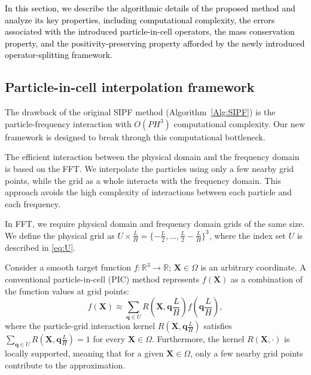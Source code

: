 \documentclass[review,onefignum,onetabnum]{siamart250211}
\begin{document}
\textcolor{black}{
In this section, we describe the algorithmic details of the proposed method and analyze its key properties, including computational complexity, the errors associated with the introduced particle-in-cell operators, the mass conservation property, and the positivity-preserving property afforded by the newly introduced operator-splitting framework.}
\label{sec:PIC}
\subsection{Particle-in-cell interpolation framework}\label{subsec:interpolation}
The drawback of the original SIPF method (Algorithm~\ref{Alg:SIPF}) is the particle-frequency interaction with $O(PH^3)$ computational complexity. Our new framework is designed to break through this computational bottleneck.

The efficient interaction between the physical domain and the frequency domain is based on the FFT. We interpolate the particles using only a few nearby grid points, while the grid as a whole interacts with the frequency domain. This approach avoids the high complexity of interactions between each particle and each frequency.

In FFT, we require physical domain and frequency domain grids of the same size. We define the physical grid as \(U \times \frac{L}{H} = \{ -\frac{L}{2}, \ldots, \frac{L}{2} - \frac{L}{H}\}^3\), where the index set \(U\) is described in \eqref{eq:U}.

Consider a smooth target function \( f: \mathbb{R}^3 \to \mathbb{R} \); \(\mathbf{X} \in \Omega\) is an arbitrary coordinate. A conventional particle-in-cell (PIC) method \cite{alma99} represents \(f(\mathbf{X})\) as a combination of the function values at grid points:
\begin{equation}
\label{eq:full}
f(\mathbf{X}) \approx \sum_{\mathbf{q} \in U} R\left(\mathbf{X}, \mathbf{q}\frac{L}{H}\right)f\left(\mathbf{q}\frac{L}{H}\right),
\end{equation}
where the particle-grid interaction kernel $R\left(\mathbf{X}, \mathbf{q}\frac{L}{H}\right)$ satisfies \(\sum_{\mathbf{q}\in U}R\left(\mathbf{X}, \mathbf{q}\frac{L}{H}\right)=1\) for every $\mathbf{X} \in \Omega$. Furthermore, the kernel \(R(\mathbf{X},\cdot)\) is locally supported, meaning that for a given $\mathbf{X} \in \Omega$, only a few nearby grid points contribute to the approximation.
\end{document}
